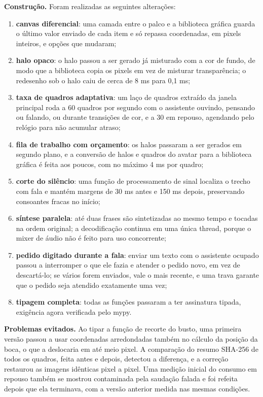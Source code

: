\textbf{Construção.} Foram realizadas as seguintes alterações:
\begin{enumerate}[label=\alph*)]
  \item \textbf{canvas diferencial}: uma camada entre o palco e a biblioteca gráfica guarda o último valor
        enviado de cada item e só repassa coordenadas, em pixels inteiros, e opções que mudaram;
  \item \textbf{halo opaco}: o halo passou a ser gerado já misturado com a cor de fundo, de modo que a
        biblioteca copia os pixels em vez de misturar transparência; o redesenho sob o halo caiu de
        cerca de 8 ms para 0,1 ms;
  \item \textbf{taxa de quadros adaptativa}: um laço de quadros extraído da janela principal roda a 60
        quadros por segundo com o assistente ouvindo, pensando ou falando, ou durante transições de cor,
        e a 30 em repouso, agendando pelo relógio para não acumular atraso;
  \item \textbf{fila de trabalho com orçamento}: os halos passaram a ser gerados em segundo plano, e a
        conversão de halos e quadros do avatar para a biblioteca gráfica é feita aos poucos, com no
        máximo 4 ms por quadro;
  \item \textbf{corte do silêncio}: uma função de processamento de sinal localiza o trecho com fala e
        mantém margens de 30 ms antes e 150 ms depois, preservando consoantes fracas no início;
  \item \textbf{síntese paralela}: até duas frases são sintetizadas ao mesmo tempo e tocadas na ordem
        original; a decodificação continua em uma única thread, porque o mixer de áudio não é feito
        para uso concorrente;
  \item \textbf{pedido digitado durante a fala}: enviar um texto com o assistente ocupado passou a
        interromper o que ele fazia e atender o pedido novo, em vez de descartá-lo; se vários forem
        enviados, vale o mais recente, e uma trava garante que o pedido seja atendido exatamente uma vez;
  \item \textbf{tipagem completa}: todas as funções passaram a ter assinatura tipada, exigência agora
        verificada pelo mypy.
\end{enumerate}

\textbf{Problemas evitados.} Ao tipar a função de recorte do busto, uma primeira versão passou a usar
coordenadas arredondadas também no cálculo da posição da boca, o que a deslocaria em até meio pixel. A
comparação do resumo SHA-256 de todos os quadros, feita antes e depois, detectou a diferença, e a
correção restaurou as imagens idênticas pixel a pixel. Uma medição inicial do consumo em repouso também
se mostrou contaminada pela saudação falada e foi refeita depois que ela terminava, com a versão anterior
medida nas mesmas condições.

